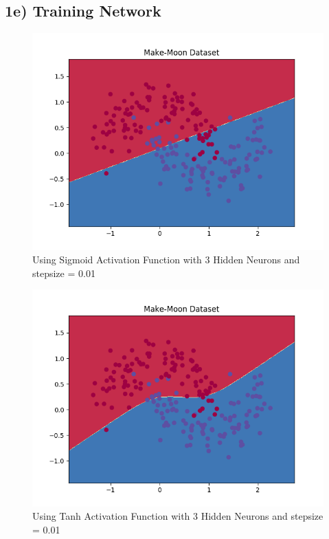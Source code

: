\documentclass{article}
\begin{document}
\subsection*{1e) Training Network}
	\begin{figure}[H]
		\centering
		\includegraphics[width=12cm]{figures/sigmoid.png}
		\caption{Using Sigmoid Activation Function with 3 Hidden Neurons and stepsize = 0.01}
	\end{figure}
	
	\begin{figure}[H]
		\centering
		\includegraphics[width=12cm]{figures/tanh.png}
		\caption{Using Tanh Activation Function with 3 Hidden Neurons and stepsize = 0.01}
	\end{figure}
\end{document}
